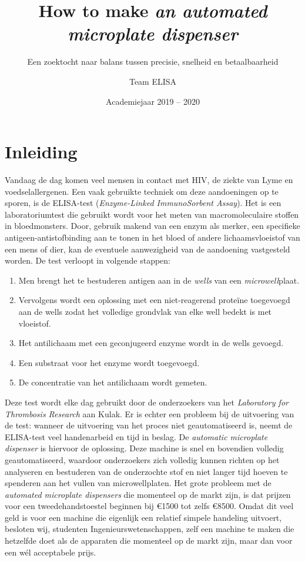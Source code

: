 \documentclass[a4paper,twoside,kulak]{kulakreport} %
\title{How to make \textit{an automated microplate dispenser}}
\subtitle{Een zoektocht naar balans tussen precisie, snelheid en betaalbaarheid}
\author{Team ELISA}
\institute{Matthias Derez, Maxime Dujardin, Korneel Verkens, Seppe Vilain}
\date{Academiejaar 2019 -- 2020}
\begin{document}
\sffamily
\titlepage

\tableofcontents

\chapter*{Inleiding}
Vandaag de dag komen veel mensen in contact met HIV, de ziekte van Lyme en voedselallergenen. Een vaak gebruikte techniek om deze aandoeningen op te sporen, is de ELISA-test (\textit{Enzyme-Linked ImmunoSorbent Assay}). Het is een laboratoriumtest die gebruikt wordt voor het meten van macromoleculaire stoffen in bloedmonsters. Door, gebruik makend van een enzym als merker, een specifieke antigeen-antistofbinding aan te tonen in het bloed of andere lichaamsvloeistof van een mens of dier, kan de eventuele aanwezigheid van de aandoening vastgesteld worden. 
\newline
De test verloopt in volgende stappen:
\begin{enumerate}
	\item Men brengt het te bestuderen antigen aan in de \textit{wells} van een \textit{microwell}plaat.
	\item Vervolgens wordt een oplossing met een niet-reagerend proteïne toegevoegd aan de wells zodat het volledige grondvlak van elke well bedekt is met vloeistof.
	\item Het antilichaam met een geconjugeerd enzyme wordt in de wells gevoegd.
	\item Een substraat voor het enzyme wordt toegevoegd. 
	\item De concentratie van het antilichaam wordt gemeten.
\end{enumerate}
Deze test wordt elke dag gebruikt door de onderzoekers van het \textit{Laboratory for Thrombosis Research} aan Kulak. Er is echter een probleem bij de uitvoering van de test: wanneer de uitvoering van het proces niet geautomatiseerd is, neemt de ELISA-test veel handenarbeid en tijd in beslag. De \textit{automatic microplate dispenser} is hiervoor de oplossing. Deze machine is snel en bovendien volledig geautomatiseerd, waardoor onderzoekers zich volledig kunnen richten op het analyseren en bestuderen van de onderzochte stof en niet langer tijd hoeven te spenderen aan het vullen van microwellplaten. 
Het grote probleem met de \textit{automated microplate dispensers} die momenteel op de markt zijn, is dat prijzen voor een tweedehandstoestel beginnen bij \euro 1500 tot zelfs \euro 8500. Omdat dit veel geld is voor een machine die eigenlijk een relatief simpele handeling uitvoert, besloten wij, studenten Ingenieurswetenschappen, zelf een machine te maken die hetzelfde doet als de apparaten die momenteel op de markt zijn, maar dan voor een wél acceptabele prijs.
\end{document}
